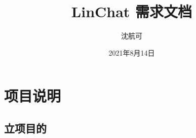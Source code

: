 \documentclass[UTF8]{ctexart}
\title{LinChat 需求文档}
\author{沈航可}
\date{2021年8月14日}
\begin{document}
\maketitle
\section{项目说明}
\subsection{立项目的}
\end{document}
